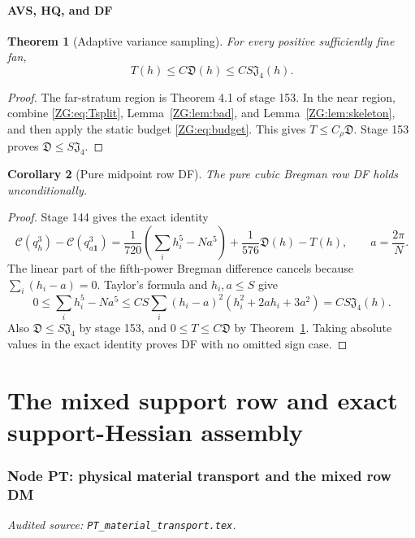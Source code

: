 \documentclass[11pt]{amsart}
\numberwithin{equation}{section}
\newtheorem{theorem}{Theorem}[section]
\newtheorem{corollary}[theorem]{Corollary}
\theoremstyle{definition}
\theoremstyle{remark}
\newcommand{\Jfour}{\mathfrak J_4}
\newcommand{\Dvar}{\mathfrak D}
\newcommand{\Cnull}{\mathcal C}
\begin{document}
\subsection{AVS, HQ, and DF}

\begin{theorem}[Adaptive variance sampling]
\label{ZG:thm:AVS}
For every
positive sufficiently fine fan,
\begin{equation}\label{ZG:eq:AVS}
 \boxed{
 T(h)\le C\Dvar(h)\le CS\Jfour(h).}
\end{equation}
\end{theorem}

\begin{proof}
The far-stratum region is Theorem 4.1 of stage 153.  In the near region,
combine \eqref{ZG:eq:Tsplit}, Lemma~\ref{ZG:lem:bad}, and
Lemma~\ref{ZG:lem:skeleton}, and then apply the static budget
\eqref{ZG:eq:budget}.  This gives $T\le C_\rho\Dvar$.  Stage 153 proves
$\Dvar\le S\Jfour$.
\end{proof}

\begin{corollary}[Pure midpoint row DF]\label{ZG:cor:DF}
The pure cubic Bregman row DF holds unconditionally.
\end{corollary}

\begin{proof}
Stage 144 gives the exact identity
\[
 \Cnull(q_h^3)-\Cnull(q_{a\mathbf1}^3)
 =\frac1{720}\left(\sum_i h_i^5-Na^5\right)
  +\frac1{576}\Dvar(h)-T(h),
 \qquad a=\frac{2\pi}{N}.
\]
The linear part of the fifth-power Bregman difference cancels because
$\sum_i(h_i-a)=0$.  Taylor's formula and $h_i,a\le S$ give
\[
 0\le\sum_i h_i^5-Na^5
 \le CS\sum_i(h_i-a)^2(h_i^2+2ah_i+3a^2)
 =CS\Jfour(h).
\]
Also $\Dvar\le S\Jfour$ by stage 153, and
$0\le T\le C\Dvar$ by Theorem~\ref{ZG:thm:AVS}.  Taking absolute values in
the exact identity proves DF with no omitted sign case.
\end{proof}
\endgroup


\part{The mixed support row and exact support-Hessian assembly}

\begingroup
\section{Node PT: physical material transport and the mixed row DM}
\label{module:PT}
\noindent\textit{Audited source: \nolinkurl{PT_material_transport.tex}.}
\end{document}
